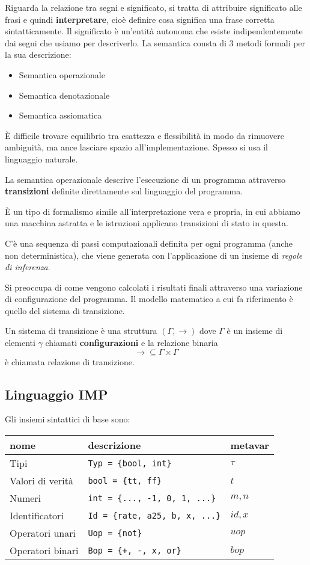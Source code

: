 \documentclass[a4paper, 10pt]{article}
\begin{document}
\begin{enumerate}
		Riguarda la relazione tra segni e significato, si tratta di attribuire significato alle frasi e quindi \textbf{interpretare}, cioè definire cosa significa una frase corretta sintatticamente.
		Il significato è un'entità autonoma che esiste indipendentemente dai segni che usiamo per descriverlo.
		La semantica consta di 3 metodi formali per la sua descrizione:
		\begin{itemize}
			\item Semantica operazionale
			\item Semantica denotazionale 
			\item Semantica assiomatica
		\end{itemize}
		È difficile trovare equilibrio tra esattezza e flessibilità in modo da rimuovere ambiguità, ma ance lasciare spazio all'implementazione. Spesso si usa il linguaggio naturale.
	\end{enumerate}
	
	La semantica operazionale descrive l'esecuzione di un programma attraverso \textbf{transizioni} definite direttamente sul linguaggio del programma.
	
	\noindent
	È un tipo di formalismo simile all'interpretazione vera e propria, in cui abbiamo una macchina astratta e le istruzioni applicano transizioni di stato in questa.
	
	\noindent
	C'è una sequenza di passi computazionali definita per ogni programma (anche non deterministica), che viene generata con l'applicazione di un insieme di \textit{regole di inferenza}.
	
	\noindent
	Si preoccupa di come vengono calcolati i risultati finali attraverso una variazione di configurazione del programma. Il modello matematico a cui fa riferimento è quello del sistema di transizione.
	
	Un sistema di transizione è una struttura $(\Gamma, \to)$ dove $\Gamma$ è un insieme di elementi $\gamma$ chiamati \textbf{configurazioni} e la relazione binaria 
	\[
	\to\subseteq \Gamma \times \Gamma
	\] 
	è chiamata relazione di transizione.
	
	\subsection{Linguaggio IMP}
	Gli insiemi sintattici di base sono:
	
	\vspace*{0.5cm}
	
	\begin{tabular}{lll}
		\toprule
		nome & descrizione & metavar \\
		\midrule
		Tipi & \lstinline|Typ = {bool, int}| &  $ \tau $ \\
		Valori di verità & \lstinline|bool = {tt, ff}| &  $ t $  \\
		Numeri & \lstinline|int = {..., -1, 0, 1, ...}| &  $ m, n $ \\
		Identificatori & \lstinline|Id = {rate, a25, b, x, ...}| &  $ id, x $ \\
		Operatori unari & \lstinline|Uop = {not}| &  $ uop $ \\
		Operatori binari & \lstinline|Bop = {+, -, x, or}| &  $ bop $ 
	\end{tabular}
	
\end{document}
